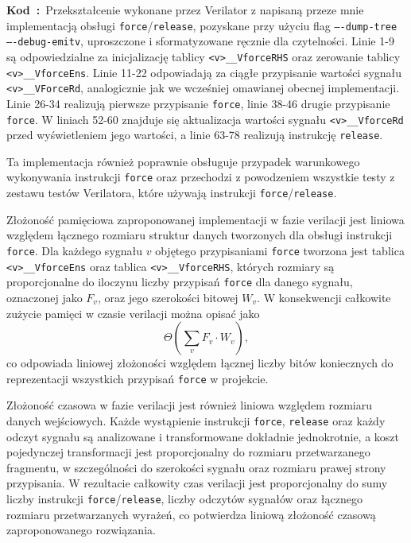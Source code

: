 \documentclass[shortabstract, inz]{iithesis}
\newcounter{kod}[chapter]
\renewcommand{\thekod}{\thechapter\arabic{kod}}
\newcommand{\codecaption}[2]{%
  \par\refstepcounter{kod}\label{#1}%
  \noindent\textbf{Kod~\thekod:}~#2\par
  \vspace*{1.0\baselineskip}%
}
\begin{document}
\codecaption{lst:force-loop}{Przekształcenie wykonane przez Verilator z napisaną przeze mnie implementacją obsługi \texttt{force}/\texttt{release}, pozyskane przy użyciu flag \texttt{----dump-tree ----debug-emitv}, uproszczone i sformatyzowane ręcznie dla czytelności. Linie 1-9 są odpowiedzialne za inicjalizację tablicy \texttt{<v>\_\_VforceRHS} oraz zerowanie tablicy \texttt{<v>\_\_VforceEns}. Linie 11-22 odpowiadają za ciągłe przypisanie wartości sygnału \texttt{<v>\_\_VForceRd}, analogicznie jak we wcześniej omawianej obecnej implementacji. Linie 26-34 realizują pierwsze przypisanie \texttt{force}, linie 38-46 drugie przypisanie \texttt{force}. W liniach 52-60 znajduje się aktualizacja wartości sygnału \texttt{<v>\_\_VforceRd} przed wyświetleniem jego wartości, a linie 63-78 realizują instrukcję \texttt{release}.}

Ta implementacja również poprawnie obsługuje przypadek warunkowego wykonywania instrukcji \texttt{force} oraz przechodzi z powodzeniem wszystkie testy z zestawu testów Verilatora, które używają instrukcji \texttt{force}/\texttt{release}.

Złożoność pamięciowa zaproponowanej implementacji w fazie verilacji jest liniowa względem łącznego rozmiaru struktur danych tworzonych dla obsługi instrukcji \texttt{force}. Dla każdego sygnału $v$ objętego przypisaniami \texttt{force} tworzona jest tablica \texttt{<v>\_\_VforceEns} oraz tablica \texttt{<v>\_\_VforceRHS}, których rozmiary są proporcjonalne do iloczynu liczby przypisań \texttt{force} dla danego sygnału, oznaczonej jako $F_v$, oraz jego szerokości bitowej $W_v$. W konsekwencji całkowite zużycie pamięci w czasie verilacji można opisać jako
\[
    \Theta\!\left(\sum_v F_v \cdot W_v\right),
\]
co odpowiada liniowej złożoności względem łącznej liczby bitów koniecznych do reprezentacji wszystkich przypisań \texttt{force} w projekcie.

Złożoność czasowa w fazie verilacji jest również liniowa względem rozmiaru danych wejściowych. Każde wystąpienie instrukcji \texttt{force}, \texttt{release} oraz każdy odczyt sygnału są analizowane i transformowane dokładnie jednokrotnie, a koszt pojedynczej transformacji jest proporcjonalny do rozmiaru przetwarzanego fragmentu, w szczególności do szerokości sygnału oraz rozmiaru prawej strony przypisania. W rezultacie całkowity czas verilacji jest proporcjonalny do sumy liczby instrukcji \texttt{force}/\texttt{release}, liczby odczytów sygnałów oraz łącznego rozmiaru przetwarzanych wyrażeń, co potwierdza liniową złożoność czasową zaproponowanego rozwiązania.
\end{document}

